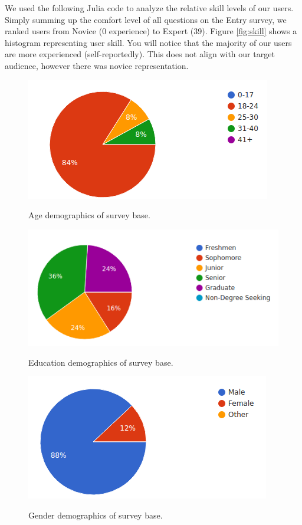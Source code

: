 We used the following Julia code to analyze the relative skill levels of our
users. Simply summing up the comfort level of all questions on the Entry survey,
we ranked users from Novice (0 experience) to Expert (39). Figure
\ref{fig:skill} shows a histogram representing user skill. You will notice that
the majority of our users are more experienced (self-reportedly). This does not
align with our target audience, however there was novice representation.

\begin{figure}[ht]
  \centering
  \includegraphics[width=0.8\linewidth]{figures/stats/age.png}
  \label{fig:age}
  \caption{ Age demographics of survey base. }
\end{figure}

\begin{figure}[ht]
  \centering
  \includegraphics[width=0.8\linewidth]{figures/stats/edu.png}
  \label{fig:edu}
  \caption{ Education demographics of survey base. }
\end{figure}

\begin{figure}[ht]
  \centering
  \includegraphics[width=0.8\linewidth]{figures/stats/gender.png}
  \label{fig:gender}
  \caption{ Gender demographics of survey base. }
\end{figure}

